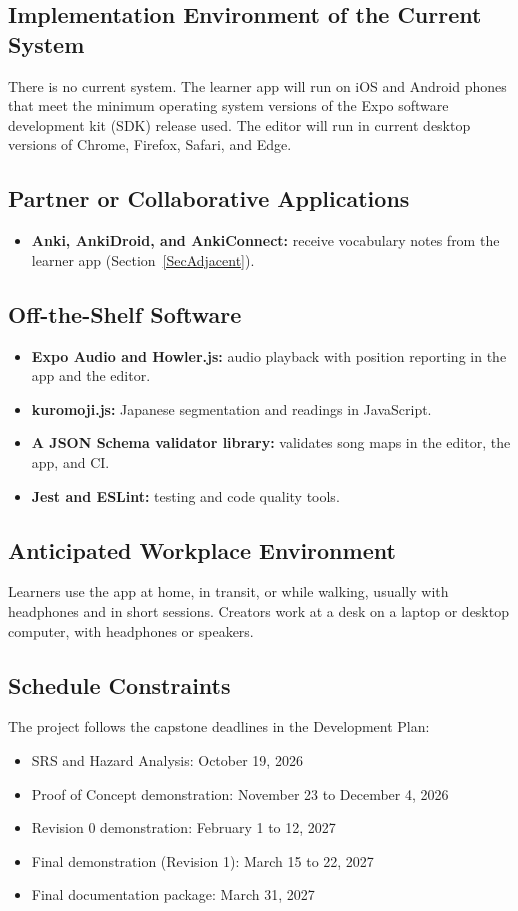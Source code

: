 \documentclass[12pt]{article}
\begin{document}
\subsection{Implementation Environment of the Current System} \label{SecImplEnv}
There is no current system. The learner app will run on iOS and Android phones
that meet the minimum operating system versions of the Expo software
development kit (SDK) release used.
The editor will run in current desktop versions of Chrome, Firefox, Safari, and
Edge.

\subsection{Partner or Collaborative Applications}
\begin{itemize}
    \item \textbf{Anki, AnkiDroid, and AnkiConnect:} receive vocabulary notes
          from the learner app (Section~\ref{SecAdjacent}).
\end{itemize}

\subsection{Off-the-Shelf Software}
\begin{itemize}
    \item \textbf{Expo Audio and Howler.js:} audio playback with position
          reporting in the app and the editor.
    \item \textbf{kuromoji.js:} Japanese segmentation and readings in
          JavaScript.
    \item \textbf{A JSON Schema validator library:} validates song maps in the
          editor, the app, and CI.
    \item \textbf{Jest and ESLint:} testing and code quality tools.
\end{itemize}

\subsection{Anticipated Workplace Environment}
Learners use the app at home, in transit, or while walking, usually with
headphones and in short sessions. Creators work at a desk on a laptop or
desktop computer, with headphones or speakers.

\subsection{Schedule Constraints}
The project follows the capstone deadlines in the Development Plan:
\begin{itemize}
    \item SRS and Hazard Analysis: October 19, 2026
    \item Proof of Concept demonstration: November 23 to December 4, 2026
    \item Revision 0 demonstration: February 1 to 12, 2027
    \item Final demonstration (Revision 1): March 15 to 22, 2027
    \item Final documentation package: March 31, 2027
\end{itemize}
\end{document}
